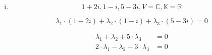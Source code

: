 \documentclass{article}
\begin{document}
\begin{enumerate}[(i)]
\begin{align*}
\begin{array}{cccc|c}
      0  & 1 & 1 & -2            & 0 \\
      0  & 0 & 1 & -\frac{21}{5} & 0 \\
      0  & 0 & 1 & -\frac{20}{3} & 0 \\
    \end{array}
    \right) \\
    &=
    \left(
    \begin{array}{cccc|c}
      1  & 2 & 1 & 3                              & 0 \\
      0  & 1 & 1 & -2                             & 0 \\
      0  & 0 & 1 & -\frac{21}{5}                  & 0 \\
      0  & 0 & 0 & \frac{63}{15} - \frac{100}{15} & 0 \\
    \end{array}
    \right) \\
    &=
    \left(
    \begin{array}{cccc|c}
      1  & 2 & 1 & 3             & 0 \\
      0  & 1 & 1 & -2            & 0 \\
      0  & 0 & 1 & -\frac{21}{5} & 0 \\
      0  & 0 & 0 & 1             & 0 \\
    \end{array}
    \right) \\
    &=
    \left(
    \begin{array}{cccc|c}
      1  & 0 & 0 & 0 & 0 \\
      0  & 1 & 0 & 0 & 0 \\
      0  & 0 & 1 & 0 & 0 \\
      0  & 0 & 0 & 1 & 0 \\
    \end{array}
    \right) \\
  \end{align*}
  Damit ist die einzige Lösung trivial $\lambda_1 = 0 = \lambda_2 = \lambda_3 = \lambda_4$ und die Vektoren
  sind linear unabhängig.

\newpage
\item
  \[
    1 + 2i, 1 - i, 5 - 3i, V = \mathbb{C}, \mathbb{K} = \mathbb{R}
  \]

  \[
    \lambda_1 \cdot (1 + 2i) + \lambda_2 \cdot (1 - i) + \lambda_3 \cdot (5 - 3i) = 0
  \]

  \begin{align*}
    \lambda_1 + \lambda_2 + 5 \cdot \lambda_3 &= 0 \\
    2 \cdot \lambda_1 - \lambda_2 - 3 \cdot \lambda_3 &= 0 \\
  \end{align*}


\end{enumerate}
\end{document}
